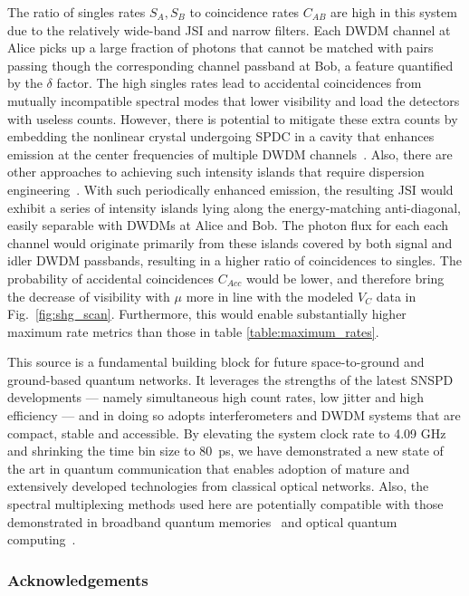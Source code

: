 \documentclass[11pt]{caltech_thesis} %
\begin{document}
The ratio of singles rates $S_A, S_B$ to coincidence rates $C_{AB}$ are high in this system due to the relatively wide-band JSI and narrow filters. Each DWDM channel at Alice picks up a large fraction of photons that cannot be matched with pairs passing though the corresponding channel passband at Bob, a feature quantified by the $\delta$ factor. The high singles rates lead to accidental coincidences from mutually incompatible spectral modes that lower visibility and load the detectors with useless counts. However, there is potential to mitigate these extra counts by embedding the nonlinear crystal undergoing SPDC in a cavity that enhances emission at the center frequencies of multiple DWDM channels~\autocite{Pomarico2009,Brydges2023,slattery2019background}. Also, there are other approaches to achieving such intensity islands that require dispersion engineering~\autocite{morrison2022frequency,xin2022spectrally}. With such periodically enhanced emission, the resulting JSI would exhibit a series of intensity islands lying along the energy-matching anti-diagonal, easily separable with DWDMs at Alice and Bob. The photon flux for each each channel would originate primarily from these islands covered by both signal and idler DWDM passbands, resulting in a higher ratio of coincidences to singles. The probability of accidental coincidences $C_{Acc}$ would be lower, and therefore bring the decrease of visibility with $\mu$ more in line with the modeled $V_C$ data in Fig.~\ref{fig:shg_scan}. Furthermore, this would enable substantially higher maximum rate metrics than those in table \ref{table:maximum_rates}.

This source is a fundamental building block for future space-to-ground and ground-based quantum networks. It leverages the strengths of the latest SNSPD developments --- namely simultaneous high count rates, low jitter and high efficiency --- and in doing so adopts interferometers and DWDM systems that are compact, stable and accessible. By elevating the system clock rate to 4.09 GHz and shrinking the time bin size to 80~ps, we have demonstrated a new state of the art in quantum communication that enables adoption of mature and extensively developed technologies from classical optical networks. Also, the spectral multiplexing methods used here are potentially compatible with those demonstrated in broadband quantum memories~\autocite{Sinclair2014} and optical quantum computing~\autocite{lukens2017frequency}.

\hypertarget{acknowledgements-1}{%
\subsubsection{Acknowledgements}\label{acknowledgements-1}}
\end{document}
